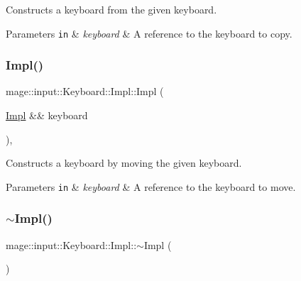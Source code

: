 Constructs a keyboard from the given keyboard.


\begin{DoxyParams}[1]{Parameters}
\mbox{\tt in}  & {\em keyboard} & A reference to the keyboard to copy. \\
\hline
\end{DoxyParams}
\hypertarget{classmage_1_1input_1_1_keyboard_1_1_impl_a97c9edb077833236e8c2f085d5ad02cc}{}\label{classmage_1_1input_1_1_keyboard_1_1_impl_a97c9edb077833236e8c2f085d5ad02cc} 
\subsubsection{\texorpdfstring{Impl()}{Impl()}\hspace{0.1cm}{\footnotesize\ttfamily [3/3]}}
{\footnotesize\ttfamily mage\+::input\+::\+Keyboard\+::\+Impl\+::\+Impl (\begin{DoxyParamCaption}\item[{\hyperlink{classmage_1_1input_1_1_keyboard_1_1_impl}{Impl} \&\&}]{keyboard }\end{DoxyParamCaption})\hspace{0.3cm}{\ttfamily [default]}, {\ttfamily [noexcept]}}

Constructs a keyboard by moving the given keyboard.


\begin{DoxyParams}[1]{Parameters}
\mbox{\tt in}  & {\em keyboard} & A reference to the keyboard to move. \\
\hline
\end{DoxyParams}
\hypertarget{classmage_1_1input_1_1_keyboard_1_1_impl_a928136f9bba9126b3cc861f05ec07675}{}\label{classmage_1_1input_1_1_keyboard_1_1_impl_a928136f9bba9126b3cc861f05ec07675} 
\subsubsection{\texorpdfstring{$\sim$\+Impl()}{~Impl()}}
{\footnotesize\ttfamily mage\+::input\+::\+Keyboard\+::\+Impl\+::$\sim$\+Impl (\begin{DoxyParamCaption}{ }\end{DoxyParamCaption})\hspace{0.3cm}{\ttfamily [default]}}

